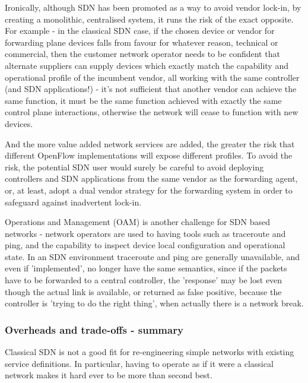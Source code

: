 Ironically, although SDN has been promoted as a way to avoid vendor lock-in, by creating a monolithic, centralised system, it runs the risk of the exact opposite.
For example - in the classical SDN case, if the chosen device or vendor for forwarding plane devices falls from favour for whatever reason, technical or commercial, then the customer network operator needs to be confident that alternate suppliers can supply devices which exactly match the capability and operational profile of the incumbent vendor, all working with the same controller (and SDN applications!) - it's not sufficient that another vendor can achieve the same function, it must be the same function achieved with exactly the same control plane interactions, otherwise the network will cease to function with new devices.

And the more value added network services are added, the greater the risk that different OpenFlow implementations will expose different profiles.  To avoid the risk, the potential SDN user would surely be careful to avoid deploying controllers and SDN applications from the same vendor as the forwarding agent, or, at least, adopt a dual vendor strategy for the forwarding system in order to safeguard against inadvertent lock-in.

Operations and Management (OAM) is another challenge for SDN based networks - network operators are used to having tools such as traceroute and ping, and the capability to inspect device local configuration and operational state.  In an SDN environment traceroute and ping are generally unavailable, and even if 'implemented', no longer have the same semantics, since if the packets have to be forwarded to a central controller, the 'response' may be lost even though the actual link is available, or returned as false positive, because the controller is 'trying to do the right thing', when actually there is a network break.


\subsubsection{Overheads and trade-offs - summary}

Classical SDN is not a good fit for re-engineering simple networks with existing service definitions.
In particular, having to operate as if it were a classical network makes it hard ever to be more than second best.

